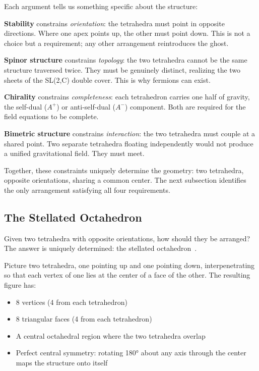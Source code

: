 \documentclass[aps,prd,preprint,superscriptaddress,showpacs,preprintnumbers,amsmath,amssymb,nofootinbib]{revtex4-2}
\begin{document}
Each argument tells us something specific about the structure:

\textbf{Stability} constrains \emph{orientation}: the tetrahedra must point in opposite directions. Where one apex points up, the other must point down. This is not a choice but a requirement; any other arrangement reintroduces the ghost.

\textbf{Spinor structure} constrains \emph{topology}: the two tetrahedra cannot be the same structure traversed twice. They must be genuinely distinct, realizing the two sheets of the SL(2,C) double cover. This is why fermions can exist.

\textbf{Chirality} constrains \emph{completeness}: each tetrahedron carries one half of gravity, the self-dual ($A^+$) or anti-self-dual ($A^-$) component. Both are required for the field equations to be complete.

\textbf{Bimetric structure} constrains \emph{interaction}: the two tetrahedra must couple at a shared point. Two separate tetrahedra floating independently would not produce a unified gravitational field. They must meet.

Together, these constraints uniquely determine the geometry: two tetrahedra, opposite orientations, sharing a common center. The next subsection identifies the only arrangement satisfying all four requirements.

\subsection{The Stellated Octahedron}
\label{subsec:stellated}

Given two tetrahedra with opposite orientations, how should they be arranged? The answer is uniquely determined: the stellated octahedron~\cite{coxeter1973}.

Picture two tetrahedra, one pointing up and one pointing down, interpenetrating so that each vertex of one lies at the center of a face of the other. The resulting figure has:
\begin{itemize}
\item 8 vertices (4 from each tetrahedron)
\item 8 triangular faces (4 from each tetrahedron)
\item A central octahedral region where the two tetrahedra overlap
\item Perfect central symmetry: rotating 180° about any axis through the center maps the structure onto itself
\end{itemize}
\end{document}
